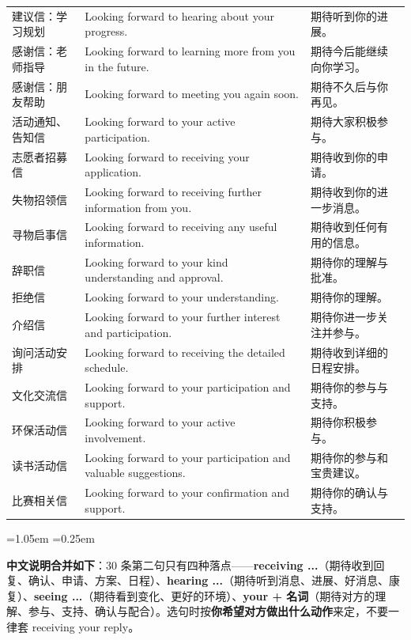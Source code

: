 \documentclass[11pt,a4paper]{ctexart}
\newcommand{\kw}[1]{{\bfseries\color{accent}#1}}
\newenvironment{note}{%
  \par\addvspace{5pt}%
  \begin{list}{}{\leftmargin=1.05em \rightmargin=0.25em \listparindent=0pt
    \itemindent=0pt \topsep=0pt \parsep=2pt \itemsep=2pt \partopsep=0pt}%
  \item\relax\small\color{ink}%
}{%
  \end{list}\addvspace{5pt}%
}
\begin{document}
\begin{longtable}{L{2.2cm}L{9.0cm}L{4.7cm}}
建议信：学习规划 & Looking forward to hearing about your progress. & 期待听到你的进展。 \\
感谢信：老师指导 & Looking forward to learning more from you in the future. & 期待今后能继续向你学习。 \\
感谢信：朋友帮助 & Looking forward to meeting you again soon. & 期待不久后与你再见。 \\
活动通知、告知信 & Looking forward to your active participation. & 期待大家积极参与。 \\
志愿者招募信 & Looking forward to receiving your application. & 期待收到你的申请。 \\
失物招领信 & Looking forward to receiving further information from you. & 期待收到你的进一步消息。 \\
寻物启事信 & Looking forward to receiving any useful information. & 期待收到任何有用的信息。 \\
辞职信 & Looking forward to your kind understanding and approval. & 期待你的理解与批准。 \\
拒绝信 & Looking forward to your understanding. & 期待你的理解。 \\
介绍信 & Looking forward to your further interest and participation. & 期待你进一步关注并参与。 \\
询问活动安排 & Looking forward to receiving the detailed schedule. & 期待收到详细的日程安排。 \\
文化交流信 & Looking forward to your participation and support. & 期待你的参与与支持。 \\
环保活动信 & Looking forward to your active involvement. & 期待你积极参与。 \\
读书活动信 & Looking forward to your participation and valuable suggestions. & 期待你的参与和宝贵建议。 \\
比赛相关信 & Looking forward to your confirmation and support. & 期待你的确认与支持。 \\

\end{longtable}

\begin{note}
\textbf{中文说明合并如下}：30 条第二句只有四种落点——\kw{receiving ...}（期待收到回复、确认、申请、方案、日程）、\kw{hearing ...}（期待听到消息、进展、好消息、康复）、\kw{seeing ...}（期待看到变化、更好的环境）、\kw{your + 名词}（期待对方的理解、参与、支持、确认与配合）。选句时按\textbf{你希望对方做出什么动作}来定，不要一律套 receiving your reply。
\end{note}
\end{document}

